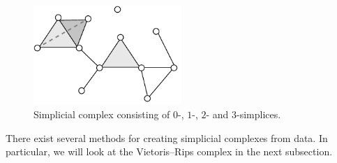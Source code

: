 \begin{figure}[H]
    \centering
    \includegraphics[width=0.5\textwidth]{thesis/figures/simplicial-complex_cropped.pdf}
    \caption{Simplicial complex consisting of $0$-, $1$-, $2$- and $3$-simplices.}
    \label{fig:simplicial-complex}
\end{figure}
There exist several methods for creating simplicial complexes from data. In particular, we will look at the Vietoris–Rips complex in the next subsection.

